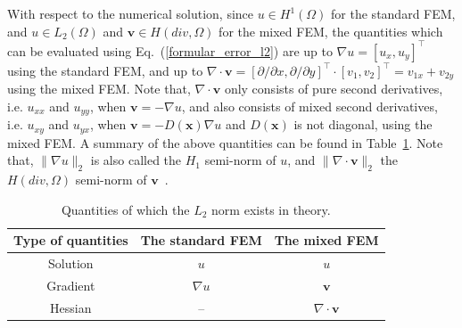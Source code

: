\documentclass[review,3p]{elsarticle}
\begin{document}
With respect to the numerical solution, since $u \in H^1(\Omega)$ for the standard FEM, and $u \in L_2(\Omega)$ and $\mathbf{v} \in H(div,\Omega)$ for the mixed FEM, the quantities which can be evaluated using Eq.~(\ref{formular_error_l2}) are up to $\nabla u = [ u_x,u_y ]^{\top}$ using the standard FEM, and up to $\nabla \cdot \mathbf{v} = [\partial / \partial x, \partial / \partial y]^{\top} \cdot [v_1, v_2]^{\top} = v_{1x} + v_{2y}$ using the mixed FEM. Note that, $\nabla \cdot \mathbf{v}$ only consists of pure second derivatives, i.e. $u_{xx}$ and $u_{yy}$, when $\mathbf{v} = -\nabla u$, and also consists of mixed second derivatives, i.e. $u_{xy}$ and $u_{yx}$, when $\mathbf{v} = -D(\mathbf{x}) \nabla u$ and $D(\mathbf{x})$ is not diagonal, using the mixed FEM.
A summary of the above quantities can be found in Table~\ref{components_existent_numerically}.
Note that, $\| \nabla u \|_2$ is also called the $H_1$ semi-norm of $u$, and $\| \nabla \cdot \mathbf{v} \|_2$ the $H(div,\Omega)$ semi-norm of $\mathbf{v}$~\cite{bangerth2007deal}.

\begin{table}[!ht]
\caption{Quantities of which the $L_2$ norm exists in theory.}
\label{components_existent_numerically}
\centering
\small
\begin{tabular}{c|c|c}
 Type of quantities & The standard FEM & The mixed FEM \\ \hline
 Solution & $u$ & $u$ \\ \cline{1-3}
 Gradient & $ \nabla u $ & $ \mathbf{v} $ \\ \cline{1-3}
 Hessian & -- & $\nabla \cdot \mathbf{v}$ \\ 
\end{tabular}
\end{table}
\end{document}
